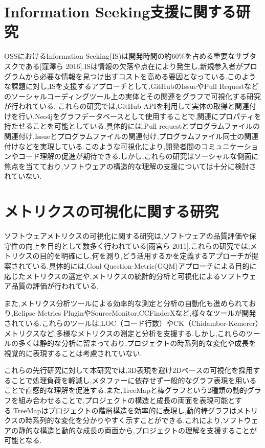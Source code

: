 \documentclass[12pt,twoside]{jbook}
\begin{document}
\section{Information Seeking支援に関する研究}
OSSにおけるInformation Seeking(IS)は開発時間の約60\%を占める重要なサブタスクである[窪澤ら 2016].ISは情報の欠落や点在により発生し,新規参入者がプログラムから必要な情報を見つけ出すコストを高める要因となっている.このような課題に対し,ISを支援するアプローチとして,GitHubのIssueやPull Requestなどのソーシャルコーディングツール上の実体とその関連をグラフで可視化する研究が行われている.
これらの研究では,GitHub APIを利用して実体の取得と関連付けを行い,Neo4jをグラフデータベースとして使用することで,関連にプロパティを持たせることを可能としている.具体的には,Pull requestとプログラムファイルの関連付け,Issueとプログラムファイルの関連付け,プログラムファイル同士の関連付けなどを実現している.このような可視化により,開発者間のコミュニケーションやコード理解の促進が期待できる.しかし,これらの研究はソーシャルな側面に焦点を当てており,ソフトウェアの構造的な理解の支援については十分に検討されていない.

\section{メトリクスの可視化に関する研究}
ソフトウェアメトリクスの可視化に関する研究は,ソフトウェアの品質評価や保守性の向上を目的として数多く行われている[雨宮ら 2011].これらの研究では,メトリクスの目的を明確にし,何を測り,どう活用するかを定義するアプローチが提案されている.具体的には,Goal-Question-Metric(GQM)アプローチによる目的に応じたメトリクスの選定や,メトリクスの統計的分析と可視化によるソフトウェア品質の評価が行われている.

また,メトリクス分析ツールによる効率的な測定と分析の自動化も進められており,Eclipse Metrics PluginやSourceMonitor,CCFinderXなど,様々なツールが開発されている.これらのツールは,LOC（コード行数）やCK（Chidamber-Kemerer）メトリクスなど,多様なメトリクスの測定と分析を支援する.しかし,これらのツールの多くは静的な分析に留まっており,プロジェクトの時系列的な変化や成長を視覚的に表現することは考慮されていない.

これらの先行研究に対して本研究では,3D表現を避け2Dベースの可視化を採用することで処理負荷を軽減し,メタファーに依存せず一般的なグラフ表現を用いることで直感的な理解を促進する.また,TreeMapと棒グラフという2種類の動的グラフを組み合わせることで,プロジェクトの構造と成長の両面を表現可能とする.TreeMapはプロジェクトの階層構造を効率的に表現し,動的棒グラフはメトリクスの時系列的な変化を分かりやすく示すことができる.これにより,ソフトウェアの静的な構造と動的な成長の両面から,プロジェクトの理解を支援することが可能となる.
\end{document}
